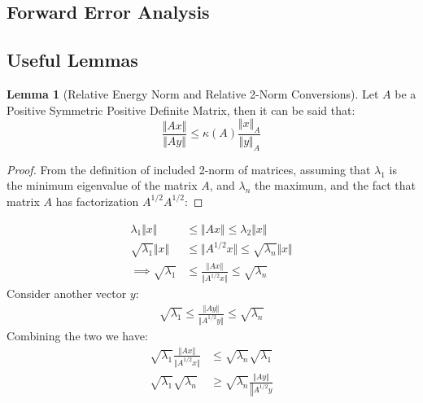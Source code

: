 \documentclass[]{article}
\theoremstyle{definition}
\newtheorem{lemma}{Lemma}[subsection]    %
\begin{document}
    \subsection{Forward Error Analysis}

\begin{appendices}
    
    \section{Useful Lemmas}
        \begin{lemma}[Relative Energy Norm and Relative 2-Norm Conversions]\label{lemma:Relative_Energy_Norm_and_Relative_2_Norm_Conversions}
            Let $A$ be a Positive Symmetric Positive Definite Matrix, then it can be said that: 
            $$
            \frac{\Vert A x\Vert}{\Vert Ay \Vert} \le \kappa(A)\frac{\Vert 
            x\Vert_A}{\Vert y \Vert_A}
            $$
        \end{lemma}
        \begin{proof}
            From the definition of included 2-norm of matrices, assuming that $\lambda_1$ is the minimum eigenvalue of the matrix $A$, and $\lambda_n$ the maximum, and the fact that matrix $A$ has factorization $A^{1/2}A^{1/2}$: 
        \end{proof}
        \begin{align}
            \lambda_1 \Vert x \Vert 
            &\le \Vert Ax\Vert 
            \le \lambda_2 \Vert x\Vert
            \\
            \sqrt{\lambda_1} \Vert x\Vert 
            & \le \Vert A^{1/2}x\Vert \le \sqrt{\lambda_n}\Vert x \Vert
            \\
            \implies
            \sqrt{\lambda_1} & \le \frac{\Vert Ax\Vert}{\Vert A^{1/2}x \Vert} 
            \le \sqrt{\lambda_n}
        \end{align}
        Consider another vector $y$: 
        \begin{align}
            \sqrt{\lambda_1} \le \frac{\Vert Ay\Vert}{\Vert A^{1/2}y \Vert} \le \sqrt{\lambda_n}
        \end{align}
        Combining the two we have: 
        \begin{align}
            \sqrt{\lambda_1}\frac{\Vert Ax\Vert}{\Vert A^{1/2}x \Vert} 
            & \le \sqrt{\lambda_n}\sqrt{\lambda_1}
            \\
            \sqrt{\lambda_1}\sqrt{\lambda_n}& \ge \sqrt{\lambda_n} \frac{\Vert Ay\Vert}{\left\Vert
                A^{1/2}y
}
\end{align}
\end{appendices}
\end{document}
